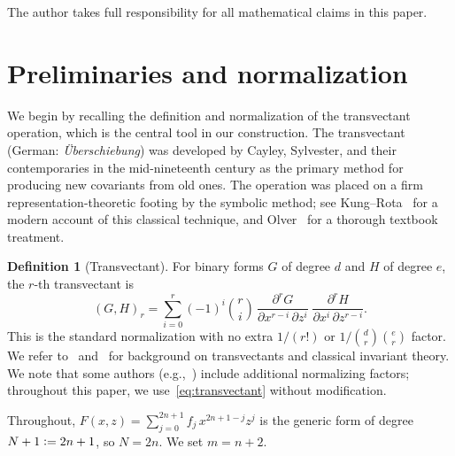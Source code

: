 \documentclass[10pt]{amsart}
\theoremstyle{definition}
\newtheorem{definition}[theorem]{Definition}
\theoremstyle{remark}
\newcommand{\defeq}{\vcentcolon=}
\begin{document}
The author takes full responsibility for all mathematical claims in
this paper.

\section{Preliminaries and normalization}\label{sec:prelim}

We begin by recalling the definition and normalization of the transvectant
operation, which is the central tool in our construction.  The transvectant
(German: \emph{\"Uberschiebung}) was developed by Cayley, Sylvester, and
their contemporaries in the mid-nineteenth century as the primary method
for producing new covariants from old ones.  The operation was placed on a
firm representation-theoretic footing by the symbolic method; see
Kung--Rota~\cite[\S4]{KungRota1984} for a modern account of this classical
technique, and Olver~\cite[Chapter~5]{Olver1999} for a thorough textbook
treatment.

\begin{definition}[Transvectant]\label{def:transvectant}
For binary forms $G$ of degree $d$ and $H$ of degree $e$, the $r$-th
transvectant is
\begin{equation}\label{eq:transvectant}
(G,H)_r = \sum_{i=0}^{r} (-1)^i \binom{r}{i}\,
\frac{\partial^r G}{\partial x^{r-i}\,\partial z^{i}}\;
\frac{\partial^r H}{\partial x^{i}\,\partial z^{r-i}}.
\end{equation}
This is the standard normalization with no extra $1/(r!)$ or
$1/\binom{d}{r}\binom{e}{r}$ factor.  We refer to~\cite{Olver1999}
and~\cite{Elliott1895} for background on transvectants and classical
invariant theory.  We note that some authors
(e.g.,~\cite{KungRota1984}) include additional normalizing factors;
throughout this paper, we use~\eqref{eq:transvectant} without
modification.
\end{definition}

Throughout, $F(x,z)=\sum_{j=0}^{2n+1}f_j\,x^{2n+1-j}z^j$ is the generic
form of degree $N+1 \defeq 2n+1$, so $N=2n$.  We set $m=n+2$.
\end{document}
